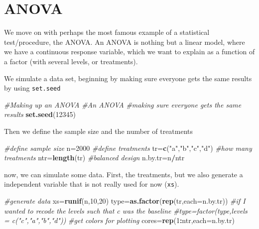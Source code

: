 \documentclass[
]{book}
\newenvironment{Shaded}{\begin{snugshade}}{\end{snugshade}}
\newcommand{\CommentTok}[1]{\textcolor[rgb]{0.56,0.35,0.01}{\textit{#1}}}
\newcommand{\DataTypeTok}[1]{\textcolor[rgb]{0.13,0.29,0.53}{#1}}
\newcommand{\DecValTok}[1]{\textcolor[rgb]{0.00,0.00,0.81}{#1}}
\newcommand{\KeywordTok}[1]{\textcolor[rgb]{0.13,0.29,0.53}{\textbf{#1}}}
\newcommand{\NormalTok}[1]{#1}
\newcommand{\OperatorTok}[1]{\textcolor[rgb]{0.81,0.36,0.00}{\textbf{#1}}}
\newcommand{\StringTok}[1]{\textcolor[rgb]{0.31,0.60,0.02}{#1}}
\begin{document}
\hypertarget{anova}{%
\section{ANOVA}\label{anova}}

We move on with perhaps the most famous example of a statistical test/procedure, the ANOVA. An ANOVA is nothing but a linear model, where we have a continuous response variable, which we want to explain as a function of a factor (with several levels, or treatments).

We simulate a data set, beginning by making sure everyone gets the same results by using \texttt{set.seed}

\begin{Shaded}
\begin{Highlighting}[]
\CommentTok{#Making up an ANOVA}
\CommentTok{#An ANOVA}
\CommentTok{#making sure everyone gets the same results}
\KeywordTok{set.seed}\NormalTok{(}\DecValTok{12345}\NormalTok{)}
\end{Highlighting}
\end{Shaded}

Then we define the sample size and the number of treatments

\begin{Shaded}
\begin{Highlighting}[]
\CommentTok{#define sample size}
\NormalTok{n=}\DecValTok{2000}
\CommentTok{#define treatments}
\NormalTok{tr=}\KeywordTok{c}\NormalTok{(}\StringTok{"a"}\NormalTok{,}\StringTok{"b"}\NormalTok{,}\StringTok{"c"}\NormalTok{,}\StringTok{"d"}\NormalTok{)}
\CommentTok{#how many treatments}
\NormalTok{ntr=}\KeywordTok{length}\NormalTok{(tr)}
\CommentTok{#balanced design}
\NormalTok{n.by.tr=n}\OperatorTok{/}\NormalTok{ntr}
\end{Highlighting}
\end{Shaded}

now, we can simulate some data. First, the treatments, but we also generate a independent variable that is not really used for now (\texttt{xs}).

\begin{Shaded}
\begin{Highlighting}[]
\CommentTok{#generate data}
\NormalTok{xs=}\KeywordTok{runif}\NormalTok{(n,}\DecValTok{10}\NormalTok{,}\DecValTok{20}\NormalTok{)}
\NormalTok{type=}\KeywordTok{as.factor}\NormalTok{(}\KeywordTok{rep}\NormalTok{(tr,}\DataTypeTok{each=}\NormalTok{n.by.tr))}
\CommentTok{#if I wanted to recode the levels such that c was the baseline}
\CommentTok{#type=factor(type,levels = c("c","a","b","d"))}
\CommentTok{#get colors for plotting}
\NormalTok{cores=}\KeywordTok{rep}\NormalTok{(}\DecValTok{1}\OperatorTok{:}\NormalTok{ntr,}\DataTypeTok{each=}\NormalTok{n.by.tr)}
\end{Highlighting}
\end{Shaded}
\end{document}
